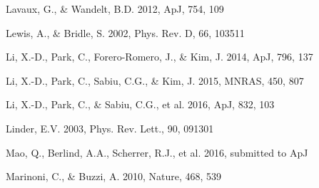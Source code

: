 \documentclass[iop]{emulateapj}
\begin{document}
\begin{thebibliography}{}




Lavaux, G., \& Wandelt, B.D. 2012, ApJ, 754, 109  


Lewis, A., \& Bridle, S. 2002, Phys. Rev. D, 66, 103511



Li, X.-D., Park, C., Forero-Romero, J., \& Kim, J. 2014, ApJ, 796, 137

Li, X.-D., Park, C., Sabiu, C.G., \& Kim, J. 2015, MNRAS, 450, 807 

%
Li, X.-D., Park, C., \& Sabiu, C.G., et al. 2016, ApJ, 832, 103

Linder, E.V. 2003, Phys. Rev. Lett., 90, 091301



Mao, Q., Berlind, A.A., Scherrer, R.J., et al. 2016, submitted to ApJ

Marinoni, C., \& Buzzi, A. 2010, Nature, 468, 539  





\end{thebibliography}
\end{document}
